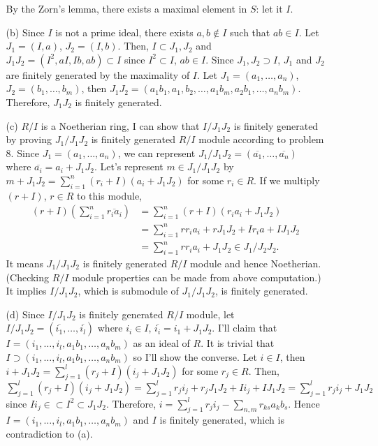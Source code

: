 \documentclass[12pt]{article}
\begin{document}
\begin{enumerate}
\begin{enumerate}
By the Zorn's lemma, there exists a maximal element in $S$: let it $I$.
\item[(b)] Since $I$ is not a prime ideal, there exists $a,b\notin I$ such that $ab\in I$. Let $J_1=(I,a)$, $J_2=(I,b)$. Then, $I\subset J_1,J_2$ and $J_1J_2=(I^2, aI, Ib, ab)\subset I$ since $I^2\subset I$, $ab\in I$. Since $J_1,J_2\supset I$, $J_1$ and $J_2$ are finitely generated by the maximality of $I$. Let $J_1=(a_1, \ldots, a_n)$, $J_2=(b_1, \ldots, b_m)$, then $J_1J_2=(a_1b_1, a_1,b_2, \ldots, a_1b_m,a_2b_1, \ldots, a_nb_m)$. Therefore, $J_1J_2$ is finitely generated.
\item[(c)] $R/I$ is a Noetherian ring, I can show that $I/J_1J_2$ is finitely generated by proving $J_1/J_1J_2$ is finitely generated $R/I$ module according to problem 8. Since $J_1=(a_1, \ldots, a_n)$, we can represent $J_1/J_1J_2=(\overline{a_1}, \ldots, \overline{a_n})$ where $\overline{a_i}=a_i+J_1J_2$. Let's represent $m\in J_1/J_1J_2$ by $m+J_1J_2=\sum\limits_{i=1}^n (r_i+I)(a_i+J_1J_2)$ for some $r_i\in R$. If we multiply $(r+I)$, $r\in R$ to this module, 
\begin{equation*}
\begin{split}
(r+I)\left(\sum\limits_{i=1}^n \overline{r_ia_i}\right)&=\sum\limits_{i=1}^n (r+I)(r_ia_i+J_1J_2) \\
&=\sum\limits_{i=1}^n r r_ia_i+rJ_1J_2+Ir_ia+IJ_1J_2 \\
&=\sum\limits_{i=1}^n r r_ia_i+J_1J_2 \in J_1/J_2J_2.
\end{split}
\end{equation*}
It means $J_1/J_1J_2$ is finitely generated $R/I$ module and hence Noetherian.(Checking $R/I$ module properties can be made from above computation.) It implies $I/J_1J_2$, which is submodule of $J_1/J_1J_2$, is finitely generated.
\item[(d)] Since $I/J_1J_2$ is finitely generated $R/I$ module, let $I/J_1J_2=(\overline{i_1}, \ldots, \overline{i_l})$ where $i_i\in I$, $\overline{i_i}=i_1+J_1J_2$. I'll claim that $I=(i_1, \ldots, i_l, a_1b_1, \ldots, a_nb_m)$ as an ideal of $R$. It is trivial that  $I\supset(i_1, \ldots, i_l, a_1b_1, \ldots, a_nb_m)$ so I'll show the converse. Let $i\in I$, then $i+J_1J_2=\sum\limits_{j=1}^l (r_j+I)(i_j+J_1J_2)$ for some $r_j\in R$. Then, $\sum\limits_{j=1}^l (r_j+I)(i_j+J_1J_2)=\sum\limits_{j=1}^l r_ji_j+r_jJ_1J_2+Ii_j+IJ_1J_2=\sum\limits_{j=1}^l r_ji_j+J_1J_2$ since $Ii_j\in \subset I^2\subset J_1J_2$. Therefore, $i=\sum\limits_{j=1}^l r_j i_j-\sum\limits_{n,m} r_{ks}a_kb_s$. Hence $I=(i_1, \ldots, i_l, a_1b_1, \ldots, a_nb_m)$ and $I$ is finitely generated, which is contradiction to (a).

\end{enumerate}
\end{enumerate}
\end{document}
